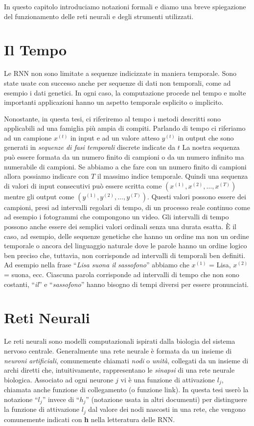 In questo capitolo introduciamo notazioni formali e diamo una breve spiegazione del funzionamento delle reti neurali e degli strumenti utilizzati.

\section{Il Tempo}

Le RNN non sono limitate a sequenze indicizzate in maniera temporale.
Sono state usate con successo anche per sequenze di dati non temporali, come ad esempio i dati genetici.
In ogni caso, la computazione procede nel tempo e molte importanti applicazioni hanno un aspetto temporale esplicito o implicito.

Nonostante, in questa tesi, ci riferiremo al tempo i metodi descritti sono applicabili ad una famiglia pi\`u ampia di compiti.
Parlando di tempo ci riferiamo ad un campione $x^{(t)}$ in input e ad un valore atteso $y^{(t)}$ in output che sono generati in \emph{sequenze di fasi temporali} discrete indicate da $t$
La nostra sequenza pu\`o essere formata da un numero finito di campioni o da un numero infinito ma numerabile di campioni.
Se abbiamo a che fare con un numero finito di campioni allora possiamo indicare con $T$ il massimo indice temporale.
Quindi una sequenza di valori di input consecutivi pu\`o essere scritta come $(x^{(1)}, x^{(2)}, \dots, x^{(T)})$ mentre gli output come $(y^{(1)}, y^{(2)}, \dots, y^{(T)})$.
Questi valori possono essere dei campioni, presi ad intervalli regolari di tempo, di un processo reale continuo come ad esempio i fotogrammi che compongono un video.
Gli intervalli di tempo possono anche essere dei semplici valori ordinali senza una durata esatta.
\`E il caso, ad esempio, delle sequenze genetiche che hanno un ordine ma non un ordine temporale o ancora del linguaggio naturale dove le parole hanno un ordine logico ben preciso che, tuttavia, non corrisponde ad intervalli di temporali ben definiti.
Ad esempio nella frase ``\emph{Lisa suona il sassofono}'' abbiamo che $x^{(1)}$ = Lisa, $x^{(2)}$ = suona, ecc. Ciascuna parola corrisponde ad intervalli di tempo che non sono costanti, ``\emph{il}'' e ``\emph{sassofono}'' hanno bisogno di tempi diversi per essere pronunciati.

\section{Reti Neurali}
Le reti neurali sono modelli computazionali ispirati dalla biologia del sistema nervoso centrale.
Generalmente una rete neurale \`e formata da un insieme di \emph{neuroni artificiali}, comunemente chiamati \emph{nodi} o \emph{unit\`a}, collegati da un insieme di archi diretti che, intuitivamente, rappresentano le \emph{sinapsi} di una rete neurale biologica.
Associato ad ogni neurone $j$ vi \`e una funzione di attivazione $l_j$, chiamata anche funzione di collegamento (o funzione link).
In questa tesi user\`o la notazione ``$l_j$'' invece di ``$h_j$'' (notazione usata in altri documenti) per distinguere la funzione di attivazione $l_j$ dal valore dei nodi nascosti in una rete, che vengono comunemente indicati con \textbf{h} nella letteratura delle RNN.

